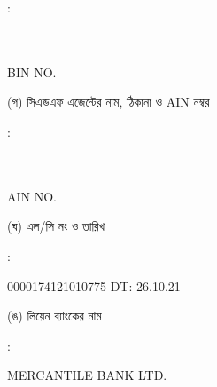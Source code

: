 \documentclass[12pt]{article}
\newcommand{\lcno}{0000174121010775}
\newcommand{\lcdt}{26.10.21}
\newcommand{\lienbank}{MERCANTILE BANK LTD.}
\newcommand{\impn}{\jsml}
\newcommand{\impadd}{\jsmla}
\newcommand{\impbin}{\jsmlbin}
\begin{document}
\begin{minipage}[t]{0.02\linewidth}
:
\end{minipage}
\begin{minipage}[t]{0.53\linewidth}
\textbf{{\impn}}
\\
{\impadd}
\\
BIN NO. {\impbin}
\\
\end{minipage}
\begin{minipage}[t]{0.05\linewidth}
\hspace*{1em}
\end{minipage}
\begin{minipage}[t]{0.40\linewidth}
(গ) সিএন্ডএফ এজেন্টের নাম, ঠিকানা
ও AIN নম্বর
\end{minipage}
\begin{minipage}[t]{0.02\linewidth}
:
\end{minipage}
\begin{minipage}[t]{0.53\linewidth}
\textbf{{\cnfn}}
\\
{\cnfadd}
\\
AIN NO. {\cnfain}
\\
\end{minipage}
\begin{minipage}[t]{0.05\linewidth}
\hspace*{1em}
\end{minipage}
\begin{minipage}[t]{0.40\linewidth}
(ঘ) এল/সি নং ও তারিখ
\end{minipage}
\begin{minipage}[t]{0.02\linewidth}
:
\end{minipage}
\begin{minipage}[t]{0.53\linewidth}
{\lcno} \hspace{2em} DT: {\lcdt}
\\
\end{minipage}
\begin{minipage}[t]{0.05\linewidth}
\hspace*{1em}
\end{minipage}
\begin{minipage}[t]{0.40\linewidth}
(ঙ) লিয়েন ব্যাংকের নাম
\end{minipage}
\begin{minipage}[t]{0.02\linewidth}
:
\end{minipage}
\begin{minipage}[t]{0.53\linewidth}
{\lienbank}
\\
\end{minipage}
\end{document}
